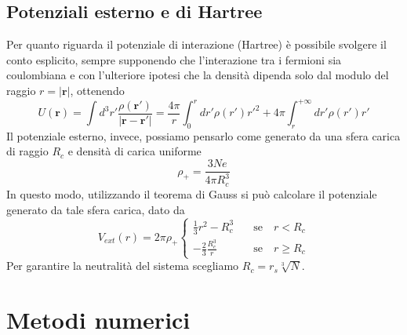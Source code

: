 \documentclass[11pt,a4paper]{article}
\begin{document}
\subsection{Potenziali esterno e di Hartree}
Per quanto riguarda il potenziale di interazione (Hartree) è possibile svolgere il conto esplicito, sempre supponendo che l'interazione tra i fermioni sia coulombiana e con l'ulteriore ipotesi che la densità dipenda solo dal modulo del raggio $r=|\textbf{r}|$, ottenendo
\begin{equation}
U(\textbf{r}) = \int d^3r' \frac{\rho(\textbf{r}')}{|\textbf{r}-\textbf{r}'|} = \frac{4\pi}{r} \int _0^r dr' \rho(r') r'^2 + 4\pi \int _r^{+\infty}dr' \rho(r') r'
\end{equation}
Il potenziale esterno, invece, possiamo pensarlo come generato da una sfera carica di raggio $R_c$ e densità di carica uniforme
\[
\rho_+ = \frac{3Ne}{4\pi R_c^3}
\]
In questo modo, utilizzando il teorema di Gauss si può calcolare il potenziale generato da tale sfera carica, dato da
\begin{equation}
V_{ext}(r) = 2\pi \rho_+ \begin{cases}
\frac{1}{3}r^2 - R_c^3 \quad &\text{se} \quad r < R_c \\
-\frac{2}{3}\frac{R_c^3}{r} \quad &\text{se} \quad r\geq R_c
\end{cases}
\end{equation}
Per garantire la neutralità del sistema scegliamo $R_c = r_s \sqrt[3]{N}$. 

\section{Metodi numerici}
\end{document}
